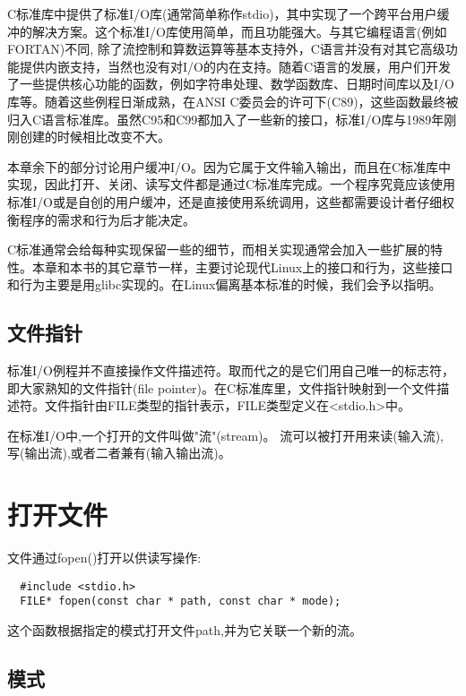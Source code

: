C标准库中提供了标准I/O库(通常简单称作stdio)，其中实现了一个跨平台用户缓冲的解决方案。这个标准I/O库使用简单，而且功能强大。与其它编程语言(例如FORTAN)不同, 除了流控制和算数运算等基本支持外，C语言并没有对其它高级功能提供内嵌支持，当然也没有对I/O的内在支持。随着C语言的发展，用户们开发了一些提供核心功能的函数，例如字符串处理、数学函数库、日期时间库以及I/O库等。随着这些例程日渐成熟，在ANSI C委员会的许可下(C89)，这些函数最终被归入C语言标准库。虽然C95和C99都加入了一些新的接口，标准I/O库与1989年刚刚创建的时候相比改变不大。

本章余下的部分讨论用户缓冲I/O。因为它属于文件输入输出，而且在C标准库中实现，因此打开、关闭、读写文件都是通过C标准库完成。一个程序究竟应该使用标准I/O或是自创的用户缓冲，还是直接使用系统调用，这些都需要设计者仔细权衡程序的需求和行为后才能决定。

C标准通常会给每种实现保留一些的细节，而相关实现通常会加入一些扩展的特性。本章和本书的其它章节一样，主要讨论现代Linux上的接口和行为，这些接口和行为主要是用glibc实现的。在Linux偏离基本标准的时候，我们会予以指明。

\subsection{文件指针}

标准I/O例程并不直接操作文件描述符。取而代之的是它们用自己唯一的标志符，即大家熟知的文件指针(file pointer)。在C标准库里，文件指针映射到一个文件描述符。文件指针由FILE类型的指针表示，FILE类型定义在<stdio.h>中。

在标准I/O中,一个打开的文件叫做"流"(stream)。 流可以被打开用来读(输入流), 写(输出流),或者二者兼有(输入输出流)。 

\section{打开文件}

文件通过fopen()打开以供读写操作:
\begin{lstlisting}
  #include <stdio.h>
  FILE* fopen(const char * path, const char * mode);
\end{lstlisting}

这个函数根据指定的模式打开文件path,并为它关联一个新的流。

\subsection{模式}

